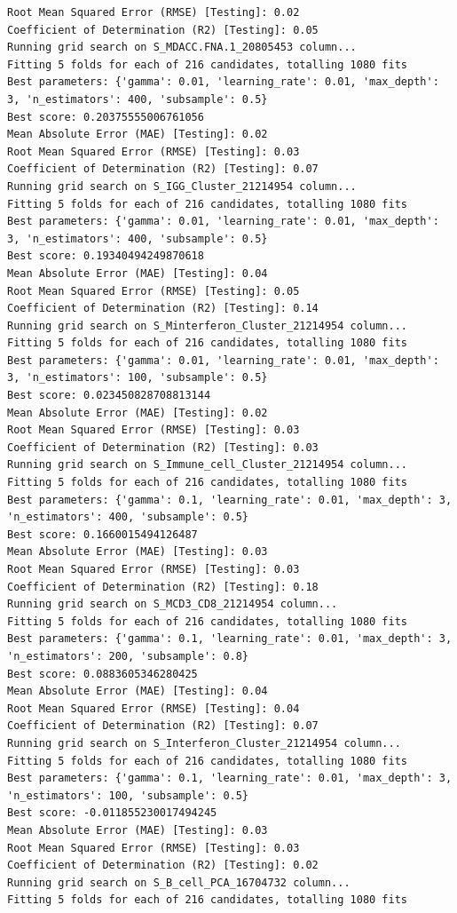 \documentclass[
  letterpaper,
  DIV=11,
  numbers=noendperiod]{scrartcl}
\begin{document}
\begin{verbatim}
Root Mean Squared Error (RMSE) [Testing]: 0.02
Coefficient of Determination (R2) [Testing]: 0.05
Running grid search on S_MDACC.FNA.1_20805453 column...
Fitting 5 folds for each of 216 candidates, totalling 1080 fits
Best parameters: {'gamma': 0.01, 'learning_rate': 0.01, 'max_depth': 3, 'n_estimators': 400, 'subsample': 0.5}
Best score: 0.20375555006761056
Mean Absolute Error (MAE) [Testing]: 0.02
Root Mean Squared Error (RMSE) [Testing]: 0.03
Coefficient of Determination (R2) [Testing]: 0.07
Running grid search on S_IGG_Cluster_21214954 column...
Fitting 5 folds for each of 216 candidates, totalling 1080 fits
Best parameters: {'gamma': 0.01, 'learning_rate': 0.01, 'max_depth': 3, 'n_estimators': 400, 'subsample': 0.5}
Best score: 0.19340494249870618
Mean Absolute Error (MAE) [Testing]: 0.04
Root Mean Squared Error (RMSE) [Testing]: 0.05
Coefficient of Determination (R2) [Testing]: 0.14
Running grid search on S_Minterferon_Cluster_21214954 column...
Fitting 5 folds for each of 216 candidates, totalling 1080 fits
Best parameters: {'gamma': 0.01, 'learning_rate': 0.01, 'max_depth': 3, 'n_estimators': 100, 'subsample': 0.5}
Best score: 0.023450828708813144
Mean Absolute Error (MAE) [Testing]: 0.02
Root Mean Squared Error (RMSE) [Testing]: 0.03
Coefficient of Determination (R2) [Testing]: 0.03
Running grid search on S_Immune_cell_Cluster_21214954 column...
Fitting 5 folds for each of 216 candidates, totalling 1080 fits
Best parameters: {'gamma': 0.1, 'learning_rate': 0.01, 'max_depth': 3, 'n_estimators': 400, 'subsample': 0.5}
Best score: 0.1660015494126487
Mean Absolute Error (MAE) [Testing]: 0.03
Root Mean Squared Error (RMSE) [Testing]: 0.03
Coefficient of Determination (R2) [Testing]: 0.18
Running grid search on S_MCD3_CD8_21214954 column...
Fitting 5 folds for each of 216 candidates, totalling 1080 fits
Best parameters: {'gamma': 0.1, 'learning_rate': 0.01, 'max_depth': 3, 'n_estimators': 200, 'subsample': 0.8}
Best score: 0.0883605346280425
Mean Absolute Error (MAE) [Testing]: 0.04
Root Mean Squared Error (RMSE) [Testing]: 0.04
Coefficient of Determination (R2) [Testing]: 0.07
Running grid search on S_Interferon_Cluster_21214954 column...
Fitting 5 folds for each of 216 candidates, totalling 1080 fits
Best parameters: {'gamma': 0.1, 'learning_rate': 0.01, 'max_depth': 3, 'n_estimators': 100, 'subsample': 0.5}
Best score: -0.011855230017494245
Mean Absolute Error (MAE) [Testing]: 0.03
Root Mean Squared Error (RMSE) [Testing]: 0.03
Coefficient of Determination (R2) [Testing]: 0.02
Running grid search on S_B_cell_PCA_16704732 column...
Fitting 5 folds for each of 216 candidates, totalling 1080 fits

\end{verbatim}
\end{document}
